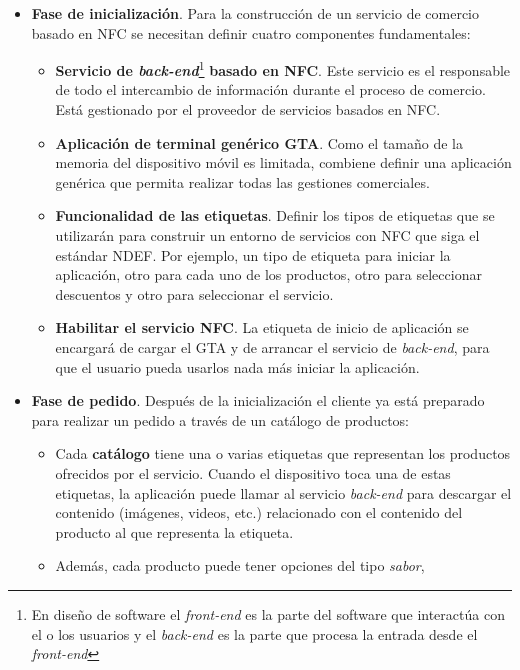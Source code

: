   \begin{itemize}
  \item \textbf{Fase de inicialización}. Para la construcción de un servicio
  de comercio basado en \acs{NFC} se necesitan definir cuatro componentes
  fundamentales:
    \begin{itemize}
    \item \textbf{Servicio de \emph{back-end}}\footnote{En diseño de software
    el \emph{front-end} es la parte del software que interactúa con el o los
    usuarios y el \emph{back-end} es la parte que procesa la entrada desde el
    \emph{front-end}} \textbf{basado en \acs{NFC}}. Este
    servicio es el responsable de todo el intercambio de información durante
    el proceso de comercio. Está gestionado por el proveedor de servicios
    basados en \acs{NFC}.
    \item \textbf{Aplicación de terminal genérico \acs{GTA}}. Como el tamaño
    de la memoria del dispositivo móvil es limitada, combiene definir una
    aplicación genérica que permita realizar todas las gestiones comerciales.
    \item \textbf{Funcionalidad de las etiquetas}. Definir los tipos de
    etiquetas que se utilizarán para construir un entorno de servicios con
    \acs{NFC} que siga el estándar \acs{NDEF}. Por ejemplo, un tipo de etiqueta
    para iniciar la aplicación, otro para cada uno de los productos, otro
    para seleccionar descuentos y otro para seleccionar el servicio.
    \item \textbf{Habilitar el servicio \acs{NFC}}. La etiqueta de inicio de
    aplicación se encargará de cargar el \acs{GTA} y de arrancar el servicio de
    \emph{back-end}, para que el usuario pueda usarlos nada más iniciar la
    aplicación.
    \end{itemize}
  \item \textbf{Fase de pedido}. Después de la inicialización el cliente ya
  está preparado para realizar un pedido a través de un catálogo de productos:
    \begin{itemize}
    \item Cada \textbf{catálogo} tiene una o varias etiquetas que representan
    los productos ofrecidos por el servicio. Cuando el dispositivo toca una
    de estas etiquetas, la aplicación puede llamar al servicio \emph{back-end}
    para descargar el contenido (imágenes, videos, etc.) relacionado con el
    contenido del producto al que representa la etiqueta.
    \item Además, cada producto puede tener opciones del tipo \emph{sabor},

\end{itemize}
\end{itemize}

